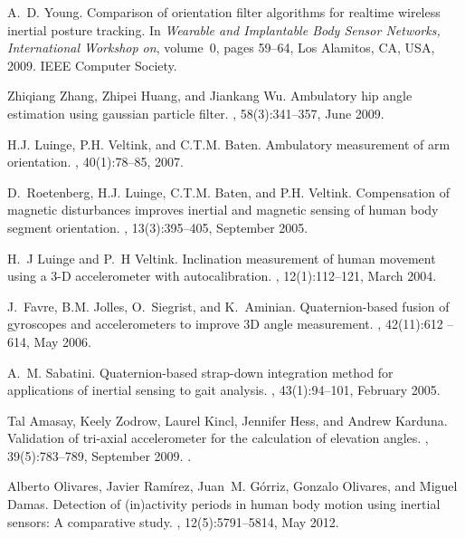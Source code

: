 \documentclass{IOS-Book-Article}
\begin{document}
\begin{thebibliography}{99}
A.~D. Young.
\newblock Comparison of orientation filter algorithms for realtime wireless
  inertial posture tracking.
\newblock In {\em Wearable and Implantable Body Sensor Networks, International
  Workshop on}, volume~0, pages 59--64, Los Alamitos, {CA}, {USA}, 2009. {IEEE}
  Computer Society.

Zhiqiang Zhang, Zhipei Huang, and Jiankang Wu.
\newblock Ambulatory hip angle estimation using gaussian particle filter.
, 58(3):341--357, June
  2009.

{H.J.} Luinge, {P.H.} Veltink, and {C.T.M.} Baten.
\newblock Ambulatory measurement of arm orientation.
, 40(1):78--85, 2007.

D.~Roetenberg, {H.J.} Luinge, {C.T.M.} Baten, and {P.H.} Veltink.
\newblock Compensation of magnetic disturbances improves inertial and magnetic
  sensing of human body segment orientation.
, 13(3):395--405, September 2005.

H.~J Luinge and P.~H Veltink.
\newblock Inclination measurement of human movement using a {3-D} accelerometer
  with autocalibration.
, 12(1):112--121, March 2004.

J.~Favre, {B.M.} Jolles, O.~Siegrist, and K.~Aminian.
\newblock Quaternion-based fusion of gyroscopes and accelerometers to improve
  {3D} angle measurement.
, 42(11):612 -- 614, May 2006.

A.~M. Sabatini.
\newblock Quaternion-based strap-down integration method for applications of
  inertial sensing to gait analysis.
, 43(1):94--101,
  February 2005.

Tal Amasay, Keely Zodrow, Laurel Kincl, Jennifer Hess, and Andrew Karduna.
\newblock Validation of tri-axial accelerometer for the calculation of
  elevation angles.
, 39(5):783--789,
  September 2009.
.

Alberto Olivares, Javier Ramírez, Juan~M. Górriz, Gonzalo Olivares, and Miguel
  Damas.
\newblock Detection of (in)activity periods in human body motion using inertial
  sensors: A comparative study.
, 12(5):5791--5814, May 2012.


\end{thebibliography}
\end{document}
